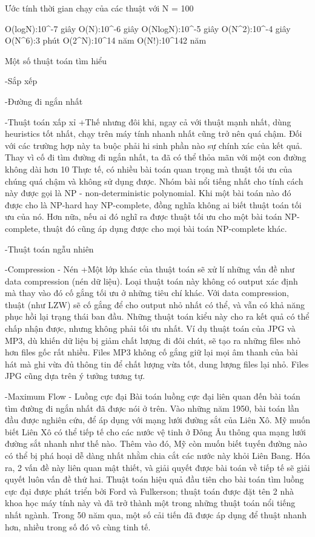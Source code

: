 Ước tính thời gian chạy của các thuật với N = 100

O(logN):10^-7  giây
O(N):10^-6  giây
O(NlogN):10^-5  giây
O(N^2):10^-4  giây
O(N^6):3  phút
O(2^N):10^14  năm
O(N!):10^142  năm


Một số thuật toán tìm hiểu 

-Sắp xếp

-Đường đi ngắn nhất

-Thuật toán xấp xỉ
+Thế nhưng đôi khi, ngay cả với thuật mạnh nhất, dùng heuristics tốt nhất,
chạy trên máy tính nhanh nhất cũng trở nên quá chậm. Đối với các trường hợp 
này ta buộc phải hi sinh phần nào sự chính xác của kết quả. Thay vì cố đi tìm
đường đi ngắn nhất, ta đã có thể thỏa mãn với một con đường không dài hơn 
10%
Thực tế, có nhiều bài toán quan trọng mà thuật tối ưu của chúng quá chậm và
không sử dụng được. Nhóm bài nổi tiếng nhất cho tính cách này được gọi là 
NP - non-deterministic polynomial. Khi một bài toán nào đó được cho là NP-hard 
hay NP-complete, đồng nghĩa không ai biết thuật toán tối ưu của nó. Hơn nữa, nếu 
ai đó nghĩ ra được thuật tối ưu cho một bài toán NP-complete, thuật đó cũng áp dụng 
được cho mọi bài toán NP-complete khác.

-Thuật toán ngẫu nhiên

-Compression - Nén
+Một lớp khác của thuật toán sẽ xử lí những vấn đề như data compression (nén dữ liệu).
Loại thuật toán này không có output xác định mà thay vào đó cố gắng tối ưu ở những tiêu 
chí khác. Với data compression, thuật (như LZW) sẽ cố gắng để cho output nhỏ nhất có thể, 
và vẫn có khả năng phục hồi lại trạng thái ban đầu. Những thuật toán kiểu này cho ra kết 
quả có thể chấp nhận được, nhưng không phải tối ưu nhất. Ví dụ thuật toán của JPG và MP3, 
dù khiến dữ liệu bị giảm chất lượng đi đôi chút, sẽ tạo ra những files nhỏ hơn files gốc 
rất nhiều. Files MP3 không cố gắng giữ lại mọi âm thanh của bài hát mà ghi vừa đủ thông 
tin để chất lượng vừa tốt, dung lượng files lại nhỏ. Files JPG cũng dựa trên ý tưởng tương tự.

-Maximum Flow - Luồng cực đại
Bài toán luồng cực đại liên quan đến bài toán tìm đường đi ngắn nhất đã được nói ở trên. 
Vào những năm 1950, bài toán lần đầu được nghiên cứu, để áp dụng với mạng lưới đường sắt 
của Liên Xô. Mỹ muốn biết Liên Xô có thể tiếp tế cho các nước vệ tinh ở Đông Âu thông qua 
mạng lưới đường sắt nhanh như thế nào.
Thêm vào đó, Mỹ còn muốn biết tuyến đường nào có thể bị phá hoại dễ dàng nhất nhằm chia 
cắt các nước này khỏi Liên Bang. Hóa ra, 2 vấn đề này liên quan mật thiết, và giải quyết 
được bài toán về tiếp tế sẽ giải quyết luôn vấn đề thứ hai.
Thuật toán hiệu quả đầu tiên cho bài toán tìm luồng cực đại được phát triển bởi Ford và 
Fulkerson; thuật toán được đặt tên 2 nhà khoa học máy tính này và đã trở thành một trong 
những thuật toán nổi tiếng nhất ngành. Trong 50 năm qua, một số cải tiến đã được áp dụng 
để thuật nhanh hơn, nhiều trong số đó vô cùng tinh tế.

